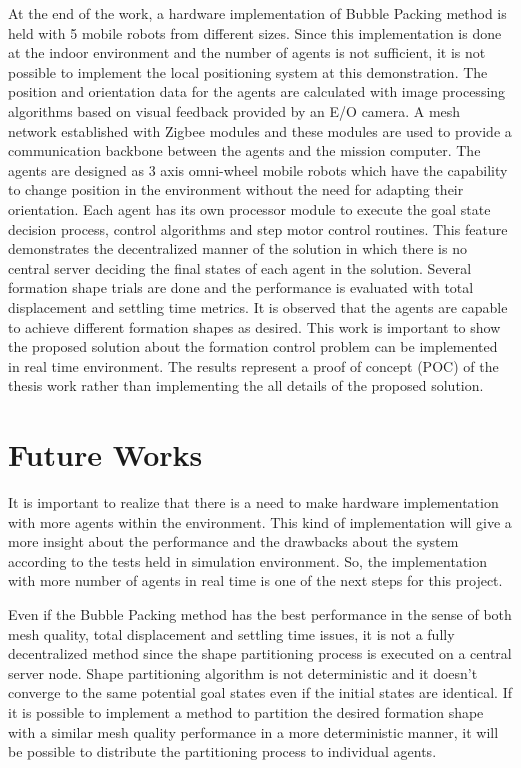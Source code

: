 At the end of the work, a hardware implementation of Bubble Packing method is held with 5 mobile robots from different sizes. Since this implementation is done at the  indoor environment and the number of agents is not sufficient, it is not possible to implement the local positioning system at this demonstration. The position and orientation data for the agents are calculated with image processing algorithms based on visual feedback provided by an E/O camera. A mesh network established with Zigbee modules and these modules are used to provide a communication backbone between the agents and the mission computer. The agents are designed as 3 axis omni-wheel mobile robots which have the capability to change position in the environment without the need for adapting their orientation. Each agent has its own processor module to execute the goal state decision process, control algorithms and step motor control routines. This feature demonstrates the decentralized manner of the solution in which  there is no central server deciding the final states of each agent in the solution. Several formation shape trials are done and the performance is evaluated with total displacement and settling time metrics. It is observed that the agents are capable to achieve different formation shapes as desired. This work is important to show the proposed solution about the formation control problem can be implemented in real time environment. The results represent a proof of concept (POC) of the thesis work rather than implementing the all details of the proposed solution.
       
\section{Future Works}
It is important to realize that there is a need to make hardware implementation with more agents within the environment. This kind of  implementation will give a more insight about the performance and the drawbacks about the system according to the tests held in simulation environment. So, the implementation with more number of agents in real time is one of the next steps for this project.
		
Even if the Bubble Packing method has the best performance in the sense of both mesh quality, total displacement and settling time issues, it is not a fully decentralized method since the shape partitioning process is executed on a central server node. Shape partitioning algorithm is not deterministic and it doesn't converge to the same potential goal states even if the initial states are identical. If it is possible to implement a method to partition the desired formation shape with a similar mesh quality performance in a more deterministic manner, it will be possible to distribute the partitioning process to individual agents. 
    
